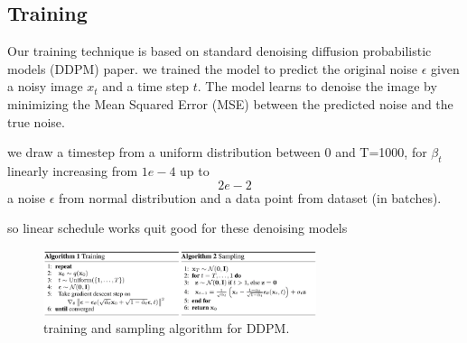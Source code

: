 \documentclass[twocolumn,superscriptaddress,aps]{revtex4-1}
\begin{document}





\subsection{Training}

Our training technique is based on standard denoising diffusion probabilistic models (DDPM) paper. we trained the model to predict the original noise $\epsilon$ given a noisy image $x_t$ and a time step $t$. The model learns to denoise the image by minimizing the Mean Squared Error (MSE) between the predicted noise and the true noise.

we draw a timestep from a uniform distribution between 0 and T=1000, for $\beta_t$ linearly increasing from $1e-4$ up to $$2e-2$$ a noise $\epsilon$ from normal distribution and a data point from dataset (in batches).

so linear schedule works quit good for these denoising models
\begin{figure}[h]
  \centering
  \includegraphics[width=8cm]{figures/training-sampling-algo-ddpm.png}
  \caption{training and sampling algorithm for DDPM.}
  \label{fig:train-sampling-algo-ddpm}
\end{figure}
\end{document}
